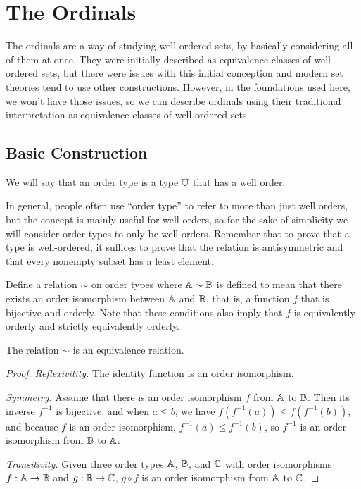 \documentclass[../../math.tex]{subfiles}
\begin{document}
\setcounter{chapter}{8}

\chapter{The Ordinals}

The ordinals are a way of studying well-ordered sets, by basically considering
all of them at once.  They were initially described as equivalence classes of
well-ordered sets, but there were issues with this initial conception and modern
set theories tend to use other constructions.  However, in the foundations used
here, we won't have those issues, so we can describe ordinals using their
traditional interpretation as equivalence classes of well-ordered sets.

\section{Basic Construction}

\begin{definition}
    We will say that an order type is a type $\mathbb{U}$ that has a well order.
\end{definition}

In general, people often use ``order type'' to refer to more than just well
orders, but the concept is mainly useful for well orders, so for the sake of
simplicity we will consider order types to only be well orders.  Remember that
to prove that a type is well-ordered, it suffices to prove that the relation is
antisymmetric and that every nonempty subset has a least element.

\begin{definition}
    Define a relation $\sim$ on order types where $\mathbb{A} \sim \mathbb{B}$ is defined to
    mean that there exists an order isomorphism between $\mathbb{A}$ and $\mathbb{B}$, that is,
    a function $f$ that is bijective and orderly.  Note that these conditions
    also imply that $f$ is equivalently orderly and strictly equivalently
    orderly.
\end{definition}

\begin{lemma}
    The relation $\sim$ is an equivalence relation.
\end{lemma}
\begin{proof}
    \textit{Reflexivitity.}  The identity function is an order isomorphism.

    \textit{Symmetry.}  Assume that there is an order isomorphism $f$ from $\mathbb{A}$
    to $\mathbb{B}$.  Then its inverse $f^{-1}$ is bijective, and when $a \leq b$, we
    have $f(f^{-1}(a)) \leq f(f^{-1}(b))$, and because $f$ is an order
    isomorphism, $f^{-1}(a) \leq f^{-1}(b)$, so $f^{-1}$ is an order isomorphism
    from $\mathbb{B}$ to $\mathbb{A}$.

    \textit{Transitivity.}  Given three order types $\mathbb{A}$, $\mathbb{B}$, and $\mathbb{C}$ with
    order isomorphisms $f : \mathbb{A} \to \mathbb{B}$ and $g : \mathbb{B} \to \mathbb{C}$, $g \circ f$ is an
    order isomorphism from $\mathbb{A}$ to $\mathbb{C}$.
\end{proof}
\end{document}
